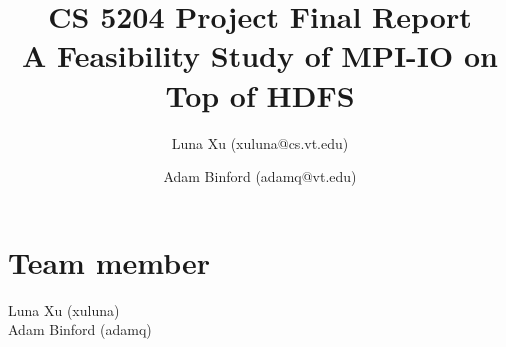 \documentclass[11pt,titlepage]{article}
\author{Luna Xu (xuluna@cs.vt.edu) \and Adam Binford (adamq@vt.edu)}
\title{CS 5204 Project Final Report \\ A Feasibility Study of MPI-IO on Top of HDFS}
\begin{document}
\maketitle

\section{Team member}
Luna Xu (xuluna)\\
Adam Binford (adamq)







{}

\end{document}
